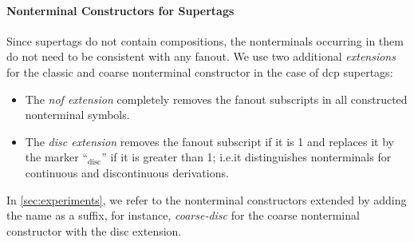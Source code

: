 \documentclass[../../document.tex]{subfiles}
\begin{document}
    \paragraph{Nonterminal Constructors for  Supertags}
    Since  supertags do not contain  compositions, the nonterminals occurring in them do not need to be consistent with any fanout.
    We use two additional \emph{extensions} for the classic and coarse nonterminal constructor in the case of dcp supertags:
    \begin{itemize}
        \item The \emph{nof extension} completely removes the fanout subscripts in all constructed nonterminal symbols.
        \item The \emph{disc extension} removes the fanout subscript if it is 1 and replaces it by the marker ``$_{\text{disc}}$'' if it is greater than 1; i.e.\@ it distinguishes nonterminals for continuous and discontinuous derivations.
    \end{itemize}
    In \cref{sec:experiments}, we refer to the nonterminal constructors extended by adding the name as a suffix, for instance, \emph{coarse-disc} for the coarse nonterminal constructor with the disc extension.
\end{document}
